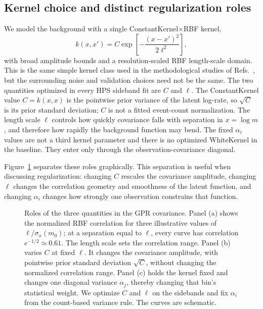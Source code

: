 \subsection{Kernel choice and distinct regularization roles}
\label{sec:kernel-choice}

We model the background with a single ConstantKernel$\times$RBF kernel,
\begin{equation}
k(x,x') = C \exp\!\left[-\frac{(x-x')^2}{2\ell^2}\right],
\end{equation}
with broad amplitude bounds and a resolution-scaled RBF length-scale domain. This is
the same simple kernel class used in the methodological studies of
Refs.~\cite{Gandrakota2023,BarrLiu2025}, but the surrounding noise and validation
choices need not be the same. The two quantities optimized in every HPS sideband fit
are $C$ and $\ell$. The ConstantKernel value $C=k(x,x)$ is the pointwise prior
variance of the latent log-rate, so $\sqrt{C}$ is its prior standard deviation; $C$
is not a fitted event-count normalization. The length scale $\ell$ controls how
quickly covariance falls with separation in $x=\log m$, and therefore how rapidly
the background function may bend. The fixed $\alpha_i$ values are not a third kernel
parameter and there is no optimized WhiteKernel in the baseline. They enter only
through the observation-covariance diagonal.

Figure~\ref{fig:gpr-hyperparameter-roles} separates these roles graphically. This
separation is useful when discussing regularization: changing $C$ rescales the
covariance amplitude, changing $\ell$ changes the correlation geometry and smoothness
of the latent function, and changing $\alpha_i$ changes how strongly one observation
constrains that function.

\begin{figure}[H]
\centering
{}
\caption{Roles of the three quantities in the GPR covariance. Panel (a) shows the
normalized RBF correlation for three illustrative values of
$\ell/\sigma_x(m_0)$; at a separation equal to $\ell$, every curve has correlation
$e^{-1/2}\simeq0.61$. The length scale sets the correlation range. Panel (b) varies
$C$ at fixed $\ell$. It changes the
covariance amplitude, with pointwise prior standard deviation $\sqrt{C}$, without
changing the normalized correlation range. Panel (c) holds the kernel fixed and
changes one diagonal variance $\alpha_j$, thereby changing that bin's statistical
weight. We optimize $C$ and $\ell$ on the sidebands and fix $\alpha_i$ from the
count-based variance rule. The curves are schematic.}
\label{fig:gpr-hyperparameter-roles}
\end{figure}

